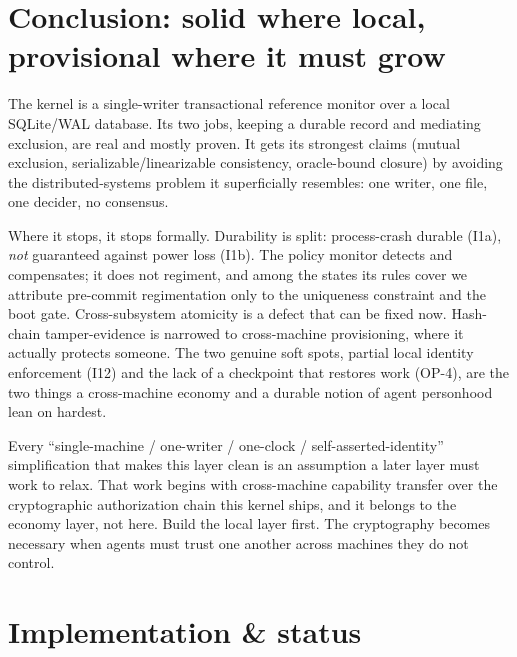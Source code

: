 \documentclass[11pt,a4paper]{article}
\theoremstyle{definition}
\theoremstyle{remark}
\begin{document}
\section{Conclusion: solid where local, provisional where it must grow}

The kernel is a single-writer transactional reference monitor over a local
SQLite/WAL database. Its two jobs, keeping a durable record and mediating
exclusion, are real and mostly proven. It gets its strongest claims (mutual
exclusion, serializable/linearizable consistency, oracle-bound closure) by
avoiding the distributed-systems problem it superficially resembles: one writer,
one file, one decider, no consensus.

Where it stops, it stops formally. Durability is split: process-crash durable
(I1a), \emph{not} guaranteed against power loss (I1b). The policy monitor detects
and compensates; it does not regiment, and among the states its rules cover we
attribute pre-commit regimentation only to the uniqueness constraint and the boot gate. Cross-subsystem
atomicity is a defect that can be fixed now. Hash-chain tamper-evidence is
narrowed to cross-machine provisioning, where it actually protects someone. The two
genuine soft spots, partial local identity enforcement (I12) and the lack of a
checkpoint that restores work (OP-4), are the two things a cross-machine economy
and a durable notion of agent personhood lean on hardest.


Every ``single-machine / one-writer / one-clock / self-asserted-identity''
simplification that makes this layer clean is an assumption a later layer must
work to relax. That work begins with cross-machine capability transfer over the
cryptographic authorization chain this kernel ships, and it belongs to the economy
layer, not here. Build the local layer first. The cryptography becomes necessary
when agents must trust one another across machines they do not control.

\appendix
\section{Implementation \& status}
\label{app:status}
\end{document}
